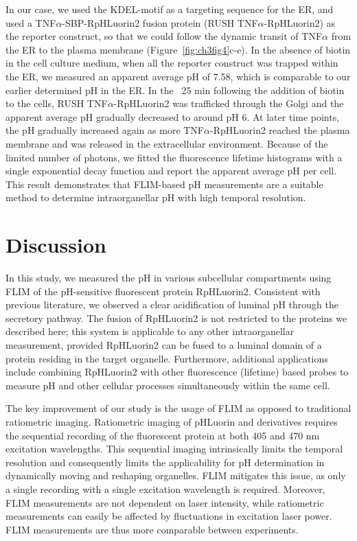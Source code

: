 In our case, we used the KDEL-motif as a targeting sequence for the ER\cite{boncompain_synchronization_2012}, and used a TNF$\alpha$-SBP-RpHLuorin2 fusion protein (RUSH TNF$\alpha$-RpHLuorin2) as the reporter construct, so that we could follow the dynamic transit of TNF$\alpha$ from the ER to the plasma membrane (Figure~\ref{fig:ch3fig4}c-e). In the absence of biotin in the cell culture medium, when all the reporter construct was trapped within the ER, we measured an apparent average pH of 7.58, which is comparable to our earlier determined pH in the ER. In the ~25 min following the addition of biotin to the cells, RUSH TNF$\alpha$-RpHLuorin2 was trafficked through the Golgi and the apparent average pH gradually decreased to around pH 6. At later time points, the pH gradually increased again as more TNF$\alpha$-RpHLuorin2 reached the plasma membrane and was released in the extracellular environment. Because of the limited number of photons, we fitted the fluorescence lifetime histograms with a single exponential decay function and report the apparent average pH per cell\cite{verboogen_fluorescence_2017}. This result demonstrates that FLIM-based pH measurements are a suitable method to determine intraorganellar pH with high temporal resolution.

\clearpage

\section{Discussion}

In this study, we measured the pH in various subcellular compartments using FLIM of the pH-sensitive fluorescent protein RpHLuorin2. Consistent with previous literature, we observed a clear acidification of luminal pH through the secretory pathway\cite{casey_sensors_2010,paroutis_ph_2004,schapiro_determinants_2000}. The fusion of RpHLuorin2 is not restricted to the proteins we described here; this system is applicable to any other intraorganellar measurement, provided RpHLuorin2 can be fused to a luminal domain of a protein residing in the target organelle. Furthermore, additional applications include combining RpHLuorin2 with other fluorescence (lifetime) based probes to measure pH and other cellular processes simultaneously within the same cell.

The key improvement of our study is the usage of FLIM as opposed to traditional ratiometric imaging. Ratiometric imaging of pHLuorin and derivatives\cite{ma_live-cell_2017,miesenbock_visualizing_1998,mahon_phluorin2:_2011} requires the sequential recording of the fluorescent protein at both 405 and 470 nm excitation wavelengths. This sequential imaging intrinsically limits the temporal resolution and consequently limits the applicability for pH determination in dynamically moving and reshaping organelles. FLIM mitigates this issue, as only a single recording with a single excitation wavelength is required. Moreover, FLIM measurements are not dependent on laser intensity\cite{wallrabe_imaging_2005,jares-erijman_fret_2003}, while ratiometric measurements can easily be affected by fluctuations in excitation laser power. FLIM measurements are thus more comparable between experiments.

